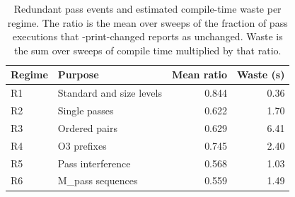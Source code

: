 \begin{table}[t]
\centering
\caption{Redundant pass events and estimated compile-time waste per regime. The ratio is the mean over sweeps of the fraction of pass executions that -print-changed reports as unchanged. Waste is the sum over sweeps of compile time multiplied by that ratio.}
\label{tab:rpb}
\setlength{\tabcolsep}{3pt}
\begin{tabular}{|l|l|r|r|}
\hline
Regime & Purpose & Mean ratio & Waste (s) \\
\hline
R1 & Standard and size levels & 0.844 & 0.36 \\
\hline
R2 & Single passes & 0.622 & 1.70 \\
\hline
R3 & Ordered pairs & 0.629 & 6.41 \\
\hline
R4 & O3 prefixes & 0.745 & 2.40 \\
\hline
R5 & Pass interference & 0.568 & 1.03 \\
\hline
R6 & M\_pass sequences & 0.559 & 1.49 \\
\hline
\end{tabular}
\end{table}
